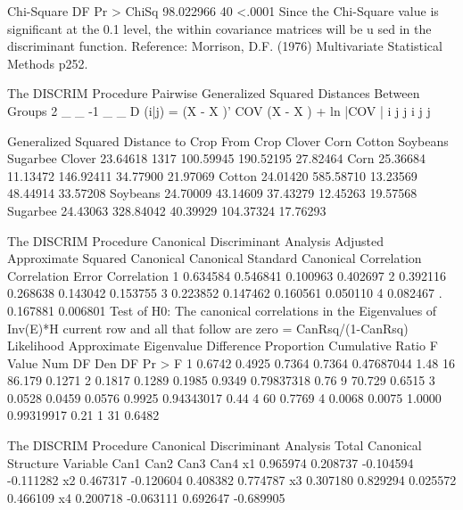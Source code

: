 \documentclass{article}
\begin{document}
\begin{Woutput}
  Chi-Square        DF    Pr > ChiSq
   98.022966        40        <.0001
Since the Chi-Square value is significant at the 0.1 level, the within covariance matrices will be u
sed in the discriminant function.
Reference: Morrison, D.F. (1976) Multivariate Statistical Methods p252.

The DISCRIM Procedure
Pairwise Generalized Squared Distances Between Groups
 2         _   _       -1  _   _
D (i|j) = (X - X )' COV   (X - X ) + ln |COV |
            i   j      j    i   j           j

                     Generalized Squared Distance to Crop
From
Crop            Clover          Corn        Cotton      Soybeans      Sugarbee
Clover        23.64618          1317     100.59945     190.52195      27.82464
Corn          25.36684      11.13472     146.92411      34.77900      21.97069
Cotton        24.01420     585.58710      13.23569      48.44914      33.57208
Soybeans      24.70009      43.14609      37.43279      12.45263      19.57568
Sugarbee      24.43063     328.84042      40.39929     104.37324      17.76293

The DISCRIM Procedure
Canonical Discriminant Analysis
                           Adjusted    Approximate        Squared
           Canonical      Canonical       Standard      Canonical
         Correlation    Correlation          Error    Correlation
       1    0.634584       0.546841       0.100963       0.402697
       2    0.392116       0.268638       0.143042       0.153755
       3    0.223852       0.147462       0.160561       0.050110
       4    0.082467        .             0.167881       0.006801
                                                      Test of H0: The canonical correlations in the
                   Eigenvalues of Inv(E)*H               current row and all that follow are zero
                     = CanRsq/(1-CanRsq)
                                                     Likelihood Approximate
         Eigenvalue Difference Proportion Cumulative      Ratio     F Value Num DF Den DF Pr > F
       1     0.6742     0.4925     0.7364     0.7364 0.47687044        1.48     16 86.179 0.1271
       2     0.1817     0.1289     0.1985     0.9349 0.79837318        0.76      9 70.729 0.6515
       3     0.0528     0.0459     0.0576     0.9925 0.94343017        0.44      4     60 0.7769
       4     0.0068                0.0075     1.0000 0.99319917        0.21      1     31 0.6482

The DISCRIM Procedure
Canonical Discriminant Analysis
                           Total Canonical Structure
Variable              Can1              Can2              Can3              Can4
x1                0.965974          0.208737         -0.104594         -0.111282
x2                0.467317         -0.120604          0.408382          0.774787
x3                0.307180          0.829294          0.025572          0.466109
x4                0.200718         -0.063111          0.692647         -0.689905


\end{Woutput}
\end{document}
